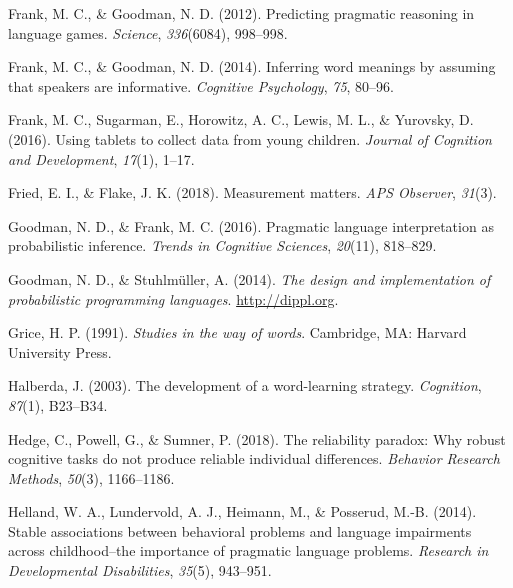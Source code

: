 \documentclass[
  man,floatsintext]{apa6}
\newlength{\cslhangindent}
\newlength{\cslentryspacingunit} %
\newenvironment{CSLReferences}[2] %
 {%
  \setlength{\parindent}{0pt}
  \ifodd #1
  \let\oldpar\par
  \def\par{\hangindent=\cslhangindent\oldpar}
  \fi
  \setlength{\parskip}{#2\cslentryspacingunit}
 }%
 {}
\begin{document}
\begin{CSLReferences}{1}{0}
\leavevmode{}%
Frank, M. C., \& Goodman, N. D. (2012). Predicting pragmatic reasoning in language games. \emph{Science}, \emph{336}(6084), 998--998.

\leavevmode{}%
Frank, M. C., \& Goodman, N. D. (2014). Inferring word meanings by assuming that speakers are informative. \emph{Cognitive Psychology}, \emph{75}, 80--96.

\leavevmode{}%
Frank, M. C., Sugarman, E., Horowitz, A. C., Lewis, M. L., \& Yurovsky, D. (2016). Using tablets to collect data from young children. \emph{Journal of Cognition and Development}, \emph{17}(1), 1--17.

\leavevmode{}%
Fried, E. I., \& Flake, J. K. (2018). Measurement matters. \emph{APS Observer}, \emph{31}(3).

\leavevmode{}%
Goodman, N. D., \& Frank, M. C. (2016). Pragmatic language interpretation as probabilistic inference. \emph{Trends in Cognitive Sciences}, \emph{20}(11), 818--829.

\leavevmode{}%
Goodman, N. D., \& Stuhlmüller, A. (2014). \emph{{The design and implementation of probabilistic programming languages}}. \url{http://dippl.org}.

\leavevmode{}%
Grice, H. P. (1991). \emph{Studies in the way of words}. Cambridge, MA: Harvard University Press.

\leavevmode{}%
Halberda, J. (2003). The development of a word-learning strategy. \emph{Cognition}, \emph{87}(1), B23--B34.

\leavevmode{}%
Hedge, C., Powell, G., \& Sumner, P. (2018). The reliability paradox: Why robust cognitive tasks do not produce reliable individual differences. \emph{Behavior Research Methods}, \emph{50}(3), 1166--1186.

\leavevmode{}%
Helland, W. A., Lundervold, A. J., Heimann, M., \& Posserud, M.-B. (2014). Stable associations between behavioral problems and language impairments across childhood--the importance of pragmatic language problems. \emph{Research in Developmental Disabilities}, \emph{35}(5), 943--951.


\end{CSLReferences}
\end{document}
